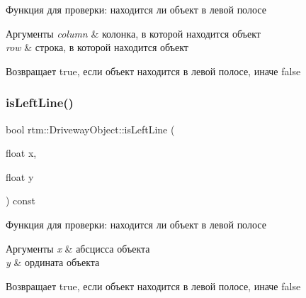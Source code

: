 Функция для проверки\+: находится ли объект в левой полосе 


\begin{DoxyParams}{Аргументы}
{\em column} & колонка, в которой находится объект \\
\hline
{\em row} & строка, в которой находится объект \\
\hline
\end{DoxyParams}
\begin{DoxyReturn}{Возвращает}
true, если объект находится в левой полосе, иначе false 
\end{DoxyReturn}
\mbox{\label{classrtm_1_1_driveway_object_afa48600b7d87a38e6c690e3b1058d177}} 
\subsubsection{\texorpdfstring{is\+Left\+Line()}{isLeftLine()}\hspace{0.1cm}{\footnotesize\ttfamily [2/2]}}
{\footnotesize\ttfamily bool rtm\+::\+Driveway\+Object\+::is\+Left\+Line (\begin{DoxyParamCaption}\item[{float}]{x,  }\item[{float}]{y }\end{DoxyParamCaption}) const}



Функция для проверки\+: находится ли объект в левой полосе 


\begin{DoxyParams}{Аргументы}
{\em x} & абсцисса объекта \\
\hline
{\em y} & ордината объекта \\
\hline
\end{DoxyParams}
\begin{DoxyReturn}{Возвращает}
true, если объект находится в левой полосе, иначе false 
\end{DoxyReturn}
\mbox{\label{classrtm_1_1_driveway_object_a6ebdc5c00005dbc2e96243767ba33273}} 
